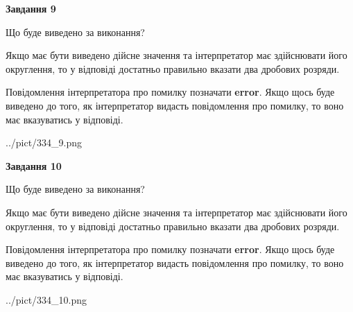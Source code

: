 \documentclass[12pt, ukrainian]{article}
\begin{document}
{\begin {Large}
{\begin {center}\textbf{Завдання 9}\end {center}}\par
Що буде виведено за виконання? \par

Якщо має бути виведено дійсне значення та інтерпретатор має здійснювати його округлення, 
то у відповіді достатньо правильно вказати два дробових розряди.

Повідомлення інтерпретатора про помилку позначати \textbf{error}.
Якщо щось буде виведено до того, як інтерпретатор видасть повідомлення про помилку, 
то воно має вказуватись у відповіді. \par

\begin{center}
	{../pict/334_9.png}
\end{center}
\newpage

{\begin {center}\textbf{Завдання 10}\end {center}}\par
Що буде виведено за виконання? \par

Якщо має бути виведено дійсне значення та інтерпретатор має здійснювати його округлення, 
то у відповіді достатньо правильно вказати два дробових розряди.

Повідомлення інтерпретатора про помилку позначати \textbf{error}.
Якщо щось буде виведено до того, як інтерпретатор видасть повідомлення про помилку, 
то воно має вказуватись у відповіді. \par

\begin{center}
	{../pict/334_10.png}
\end{center}
\newpage

\end {Large}}
\end{document}
